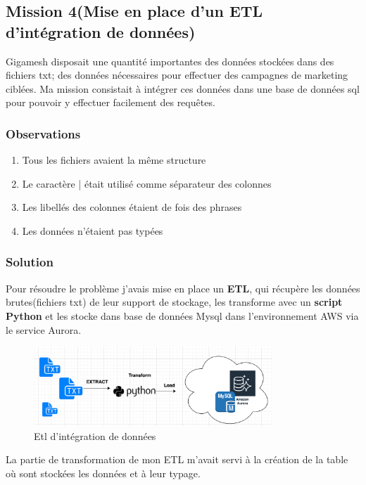\subsection{Mission 4(Mise en place d'un ETL d'intégration de données)}
Gigamesh disposait une quantité importantes des données stockées dans des fichiers txt; des données nécessaires pour effectuer des campagnes de marketing ciblées. Ma mission consistait à intégrer ces données dans une base de données sql pour pouvoir y effectuer facilement  des requêtes.

\subsubsection{Observations}
\begin{enumerate}
\item Tous les fichiers avaient la même structure
\item Le caractère | était utilisé comme séparateur des colonnes
\item Les libellés des colonnes étaient de fois des phrases
\item Les données n'étaient pas typées
\end{enumerate}
\subsubsection{Solution}
Pour résoudre le problème j'avais mise en place un \textbf{ETL}, qui récupère les données brutes(fichiers txt) de leur support de stockage, les transforme avec un \textbf{script Python} et les stocke dans base de données Mysql dans l'environnement AWS via le service Aurora. 

 \begin{figure}[!th]
            \centering
                \includegraphics[width=0.8\textwidth]{Figures/etls}
	       \decoRule
		\caption[Etl d'intégration de données]{Etl d'intégration de données}
	\label{fig:etl}
	\end{figure}
La partie de transformation de mon ETL m'avait servi à la création de la table où sont stockées les données et à leur typage. 
